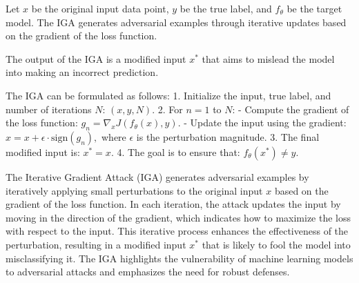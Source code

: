 Let \( x \) be the original input data point, \( y \) be the true label, and \( f_{\theta} \) be the target model. The IGA generates adversarial examples through iterative updates based on the gradient of the loss function.

The output of the IGA is a modified input \( x^* \) that aims to mislead the model into making an incorrect prediction.

The IGA can be formulated as follows:
1. Initialize the input, true label, and number of iterations \( N \):
   $
   (x, y, N).
   $
2. For \( n = 1 \) to \( N \):
   - Compute the gradient of the loss function:
   $
   g_n = \nabla_x J(f_{\theta}(x), y).
   $
   - Update the input using the gradient:
   $
   x = x + \epsilon \cdot \text{sign}(g_n),
   $
   where \( \epsilon \) is the perturbation magnitude.
3. The final modified input is:
   $
   x^* = x.
   $
4. The goal is to ensure that:
   $
   f_{\theta}(x^*) \neq y.
   $

The Iterative Gradient Attack (IGA) generates adversarial examples by iteratively applying small perturbations to the original input \( x \) based on the gradient of the loss function. In each iteration, the attack updates the input by moving in the direction of the gradient, which indicates how to maximize the loss with respect to the input. This iterative process enhances the effectiveness of the perturbation, resulting in a modified input \( x^* \) that is likely to fool the model into misclassifying it. The IGA highlights the vulnerability of machine learning models to adversarial attacks and emphasizes the need for robust defenses.
